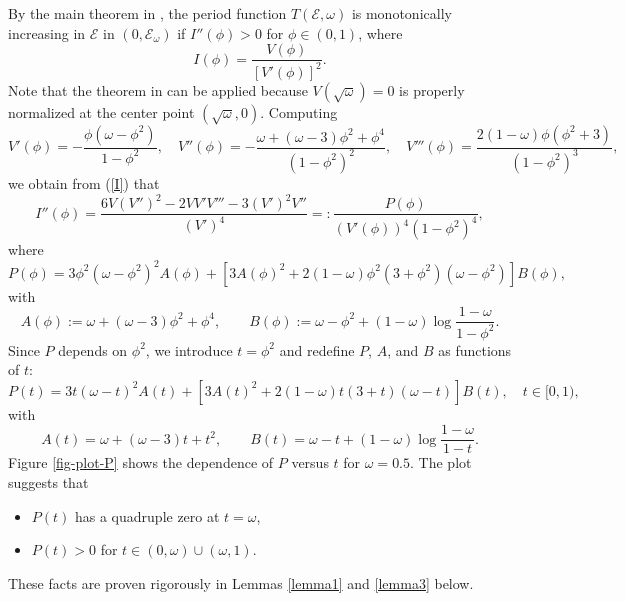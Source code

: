 \documentclass[12pt,reqno]{amsart}
\numberwithin{equation}{section}
\numberwithin{figure}{section}
\begin{document}
By the main theorem in \cite{chicone2}, the period function $T(\mathcal{E},\omega)$ is monotonically increasing in $\mathcal{E}$ in $(0,\mathcal{E}_{\omega})$ if $I''(\phi) > 0$ for $\phi \in (0,1)$, where 
\begin{equation}
\label{I}
I(\phi) = \frac{V(\phi)}{[V'(\phi)]^2}.
\end{equation}
Note that the theorem in \cite{chicone2} can be applied because $V(\sqrt{\omega}) = 0$ is properly normalized at the center point $(\sqrt{\omega},0)$. Computing
\begin{equation*}
V'(\phi) = -\frac{\phi (\omega-\phi^2)}{1-\phi^2} , \quad V''(\phi) = -\frac{\omega + (\omega-3) \phi^2 + \phi^4}{(1-\phi^2)^2} , \quad V'''(\phi) =  \frac{ 2 (1-\omega) \phi (\phi^2 + 3)}{(1-\phi^2)^3},
\end{equation*}
we obtain from (\ref{I}) that 
\begin{equation}
\label{I-second}
I''(\phi) = \frac{6V(V'')^2 - 2VV'V'''-3(V')^2V''}{(V')^4} =: \frac{P(\phi)}{(V'(\phi))^4 (1 -\phi^2)^4},
\end{equation}
where
\begin{equation*}
P(\phi) = 3 \phi^2  (\omega - \phi^2)^2 A(\phi) + \left[ 3 A(\phi)^2 + 2 (1-\omega) \phi^2 (3 + \phi^2) (\omega - \phi^2) \right] B(\phi),
\end{equation*}
with
\begin{equation*}
A(\phi) := \omega + (\omega-3) \phi^2 + \phi^4, \qquad B(\phi) := \omega-\phi^2 + (1 - \omega) \log \frac{1-\omega}{1 - \phi^2}.
\end{equation*}
Since $P$ depends on $\phi^2$, we introduce $t = \phi^2$ and redefine 
$P$, $A$, and $B$ as functions of $t$:
\begin{equation}
\label{N}
P(t) = 3 t (\omega - t)^2 A(t) + \left[  3A(t)^2 +  2  (1-\omega) t (3 + t) (\omega - t)  \right ] B(t), \quad t\in [0,1),
\end{equation}
with 
\begin{equation}\label{AB}
A(t) = \omega + (\omega-3) t + t^2, \qquad 
B(t) = \omega-t + (1 - \omega) \log \frac{1-\omega}{1 - t}.
\end{equation}
Figure \ref{fig-plot-P} shows the dependence of $P$ versus $t$ for $\omega = 0.5$. The plot suggests that 
\begin{itemize}
	\item $P(t)$ has a quadruple zero at $t = \omega$, 
	\item $P(t) > 0$ for $t \in (0,\omega) \cup (\omega,1)$. 
\end{itemize}
These facts are proven rigorously in Lemmas \ref{lemma1} and \ref{lemma3} below.
\end{document}
